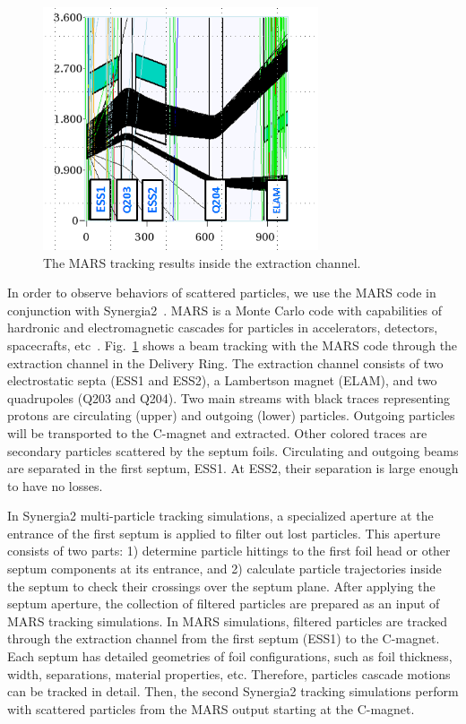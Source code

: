\documentclass[aps,prstab,onecolumn,preprint]{revtex4-1}
\begin{document}
\begin{figure}[!tbp]
  \includegraphics[width=3.2in]{img/fig_beamloss1}
  \caption{\label{fig:beamloss1}The MARS tracking results inside the extraction channel.}
\end{figure}

In order to observe behaviors of scattered particles, we use the MARS code in conjunction with Synergia2~\cite{mars1}. MARS is a Monte Carlo code with capabilities of hardronic and electromagnetic cascades for particles in accelerators, detectors, spacecrafts, etc~\cite{mars2}. Fig.~\ref{fig:beamloss1} shows a beam tracking with the MARS code through the extraction channel in the Delivery Ring. The extraction channel consists of two electrostatic septa (ESS1 and ESS2), a Lambertson magnet (ELAM), and two quadrupoles (Q203 and Q204). Two main streams with black traces representing protons are circulating (upper) and outgoing (lower) particles. Outgoing particles will be transported to the C-magnet and extracted. Other colored traces are secondary particles scattered by the septum foils. Circulating and outgoing beams are separated in the first septum, ESS1. At ESS2, their separation is large enough to have no losses. 

In Synergia2 multi-particle tracking simulations, a specialized aperture at the entrance of the first septum is applied to filter out lost particles. This aperture consists of two parts: 1) determine particle hittings to the first foil head or other septum components at its entrance, and 2) calculate particle trajectories inside the septum to check their crossings over the septum plane. After applying the septum aperture, the collection of filtered particles are prepared as an input of MARS tracking simulations. In MARS simulations, filtered particles are tracked through the extraction channel from the first septum (ESS1) to the C-magnet. Each septum has detailed geometries of foil configurations, such as foil thickness, width, separations, material properties, etc. Therefore, particles cascade motions can be tracked in detail. Then, the second Synergia2 tracking simulations perform with scattered particles from the MARS output starting at the C-magnet. 
\end{document}
